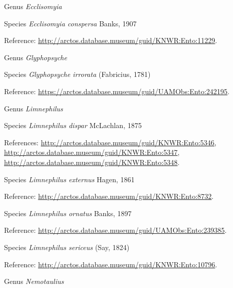 \documentclass[9pt, article]{memoir}
\begin{document}
\begin{multicols}{2}
\vspace{6pt}\noindent\hspace{30pt}Genus \textit{Ecclisomyia}


\vspace{6pt}\noindent\hspace{36pt}Species \textit{Ecclisomyia conspersa} Banks, 1907


Reference: 
\url{http://arctos.database.museum/guid/KNWR:Ento:11229}.

\vspace{6pt}\noindent\hspace{30pt}Genus \textit{Glyphopsyche}


\vspace{6pt}\noindent\hspace{36pt}Species \textit{Glyphopsyche irrorata} (Fabricius, 1781)


Reference: 
\url{https://arctos.database.museum/guid/UAMObs:Ento:242195}.

\vspace{6pt}\noindent\hspace{30pt}Genus \textit{Limnephilus}


\vspace{6pt}\noindent\hspace{36pt}Species \textit{Limnephilus dispar} McLachlan, 1875


References: 
\url{http://arctos.database.museum/guid/KNWR:Ento:5346}, 
\url{http://arctos.database.museum/guid/KNWR:Ento:5347}, 
\url{http://arctos.database.museum/guid/KNWR:Ento:5348}.

\vspace{6pt}\noindent\hspace{36pt}Species \textit{Limnephilus externus} Hagen, 1861


Reference: 
\url{http://arctos.database.museum/guid/KNWR:Ento:8732}.

\vspace{6pt}\noindent\hspace{36pt}Species \textit{Limnephilus ornatus} Banks, 1897


Reference: 
\url{http://arctos.database.museum/guid/UAMObs:Ento:239385}.

\vspace{6pt}\noindent\hspace{36pt}Species \textit{Limnephilus sericeus} (Say, 1824)


Reference: 
\url{http://arctos.database.museum/guid/KNWR:Ento:10796}.

\vspace{6pt}\noindent\hspace{30pt}Genus \textit{Nemotaulius}



\end{multicols}
\end{document}
